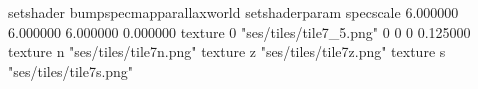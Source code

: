 setshader bumpspecmapparallaxworld
setshaderparam specscale 6.000000 6.000000 6.000000 0.000000
texture 0 "ses/tiles/tile7_5.png" 0 0 0 0.125000
texture n "ses/tiles/tile7n.png"
texture z "ses/tiles/tile7z.png"
texture s "ses/tiles/tile7s.png"

